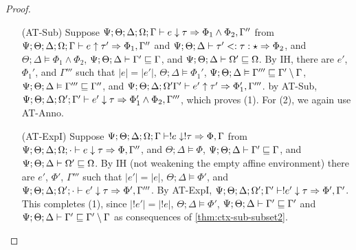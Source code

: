 \begin{proof}
\begin{itemize}
  \item[(AT-Sub)] Suppose 
    $\Psi ; \Theta ; \Delta ; \Omega ; \Gamma \vdash e \downarrow \tau \Rightarrow \Phi_1 \wedge \Phi_2,\Gamma''$ from
   $\Psi ; \Theta ; \Delta ; \Omega ; \Gamma \vdash e \uparrow \tau' \Rightarrow \Phi_1,\Gamma''$ and 
   $\Psi;\Theta;\Delta \vdash \tau' <: \tau : \star \Rightarrow \Phi_2$, and
   $\Theta ; \Delta \vDash \Phi_1 \wedge \Phi_2$,
   $\Psi ; \Theta ; \Delta \vdash \Gamma' \sqsubseteq \Gamma$, and
   $\Psi ; \Theta ; \Delta \vdash \Omega' \sqsubseteq \Omega$.
   By IH, there are $e'$,$\Phi_1'$, and $\Gamma'''$ such that
   $|e| = |e'|$,
   $\Theta ; \Delta \vDash \Phi_1'$,
   $\Psi ; \Theta ; \Delta \vDash \Gamma''' \sqsubseteq \Gamma' \setminus \Gamma$,
   $\Psi ; \Theta ; \Delta \vDash \Gamma''' \sqsubseteq \Gamma''$,
   and $\Psi ; \Theta ; \Delta ; \Omega' \Gamma' \vdash e' \uparrow \tau' \Rightarrow \Phi_1',\Gamma'''$.
   by AT-Sub, $\Psi ; \Theta ; \Delta ; \Omega' ; \Gamma' \vdash e' \downarrow \tau \Rightarrow \Phi_1' \wedge \Phi_2,\Gamma'''$, which proves (1).
   For (2), we again use AT-Anno.
   
  \item[(AT-ExpI)] Suppose $\Psi ; \Theta ; \Delta ; \Omega ; \Gamma \vdash !e \downarrow !\tau \Rightarrow \Phi, \Gamma$ from
  $\Psi ; \Theta ; \Delta ; \Omega ; \cdot \vdash e \downarrow \tau \Rightarrow \Phi, \Gamma''$, and
  $\Theta ; \Delta \vDash \Phi$,
  $\Psi ; \Theta ; \Delta \vdash \Gamma' \sqsubseteq \Gamma$, and
  $\Psi ; \Theta ; \Delta \vdash \Omega' \sqsubseteq \Omega$.
  By IH (not weakening the empty affine environment) there are $e'$, $\Phi'$, $\Gamma'''$ such that 
  $|e'| = |e|$,
  $\Theta ; \Delta \vDash \Phi'$,
  and  $\Psi ; \Theta ; \Delta ; \Omega' ; \cdot \vdash e' \downarrow \tau \Rightarrow \Phi',\Gamma'''$.
  By AT-ExpI,
  $\Psi ; \Theta ; \Delta ; \Omega' ; \Gamma' \vdash !e' \downarrow \tau \Rightarrow \Phi',\Gamma'$.
  This completes (1), since $|!e'| = |!e|$, $\Theta ; \Delta \vDash \Phi'$,
  $\Psi ; \Theta ; \Delta \vdash \Gamma' \sqsubseteq \Gamma'$ and $\Psi ; \Theta ; \Delta \vdash \Gamma' \sqsubseteq \Gamma' \setminus \Gamma$
  as consequences of \autoref{thm:ctx-sub-subset2}.
  

\end{itemize}
\end{proof}
